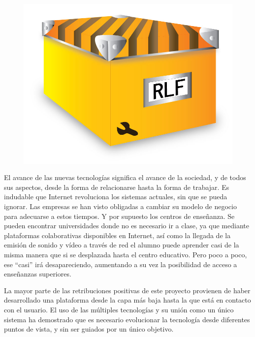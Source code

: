 

\begin{figure}
	\centering
	\includegraphics[scale=0.5]{images/logo_rlf.png}
\end{figure}

\clearpage

\vspace*{1.5cm}

El avance de las nuevas tecnologías significa el avance de la 
sociedad, y de todos sus aspectos, desde la forma de relacionarse 
hasta la forma de trabajar. Es indudable que Internet revoluciona los 
sistemas actuales, sin que se pueda ignorar. Las empresas se han visto 
obligadas a cambiar su modelo de negocio para adecuarse a estos 
tiempos. Y por supuesto los centros de enseñanza. Se pueden encontrar 
universidades donde no es necesario ir a clase, ya que mediante 
plataformas colaborativas disponibles en Internet, así como la llegada 
de la emisión de sonido y vídeo a través de red el alumno puede 
aprender casi de la misma manera que si se desplazada hasta el centro 
educativo. Pero poco a poco, ese ``casi'' irá desapareciendo, 
aumentando a su vez la posibilidad de acceso a enseñanzas superiores.

La mayor parte de las retribuciones positivas de este proyecto provienen
de haber desarrollado una plataforma desde la capa más baja hasta la 
que está en contacto con el usuario. El uso de las múltiples 
tecnologías y su unión como un único sistema ha demostrado que es 
necesario evolucionar la tecnología desde diferentes puntos de vista, 
y sin ser guiados por un único objetivo.

